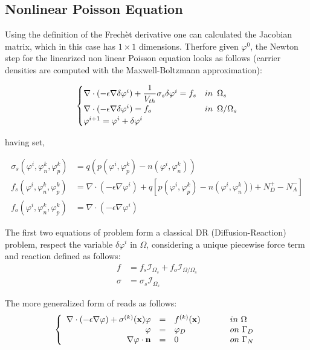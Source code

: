 \subsection{Nonlinear Poisson Equation}

Using the definition of the Frech\`et derivative one can calculated the Jacobian matrix, which in this case has $1\times 1$ dimensions. Therfore given $\varphi^0$, the Newton step for the linearized non linear Poisson equation looks as follows (carrier densities are computed with the Maxwell-Boltzmann approximation):

\begin{equation}
\label{eq: newton step NLP}
\begin{cases}

\nabla \cdot (-\epsilon \nabla \delta\varphi^{i}) 
+   \dfrac{1}{V_{th}} \sigma_s\delta\varphi^{i} 
 =  f_s & in \psp{3} \Omega_s
  \\
\nabla \cdot (-\epsilon \nabla \delta\varphi^i) =  f_o & in \psp{3} \Omega / \Omega_s 
\\
\varphi^{i+1}=\varphi^i+\delta \varphi^i
\end{cases} 
\end{equation}

having set,

\begin{align*}
\sigma_s(\varphi^{i},\varphi_n^{k},\varphi_p^{k}) & =q(p(\varphi^{i},\varphi_p^{k})-n(\varphi^{i},\varphi_n^{k}))
\\
f_s(\varphi^{i},\varphi_n^{k},\varphi_p^{k}) & = \nabla \cdot (-\epsilon \nabla \varphi^{i}) + q\left[ p(\varphi^{i},\varphi_p^{k})-n(\varphi^{i},\varphi_n^{k})) + N_D^+-N_A^- \right]
\\
f_o(\varphi^{i},\varphi_n^{k},\varphi_p^{k}) & = \nabla \cdot (-\epsilon \nabla \varphi^{i}) 
\end{align*}


The first two equations of problem  form a classical DR (Diffusion-Reaction) problem, respect the variable $\delta \varphi^i$ in $\Omega$, considering a unique piecewise force term and reaction  defined as follows:
\begin{align*}
f & = f_s \mathcal{I}_{\Omega_s} + f_o \mathcal{I}_{\Omega / \Omega_s} \\
\sigma & = \sigma_s \mathcal{I}_{\Omega_s}
\end{align*}

The more generalized form of  reads as follows:
\begin{equation}
\left\{
\begin{array}{rcll}
\nabla \cdot (-\epsilon \nabla \varphi) + \sigma^{(k)}(\vect{x}) \varphi & = &  f^{(k)}(\vect{x}) & \psp{15} in \psp{2} \Omega \\
\varphi & = & \varphi_D & \psp{15} on \psp{2} \Gamma_D \\
\nabla \varphi \cdot \vect{n} & = & 0 & \psp{15} on \psp{2} \Gamma_N
\end{array}
\right.
\end{equation}

